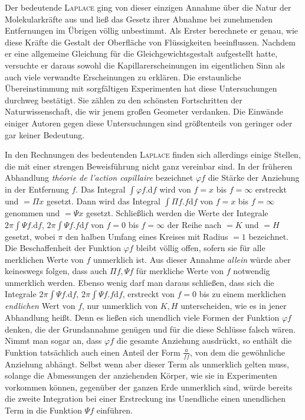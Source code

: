 Der bedeutende \textsc{Laplace} ging von dieser einzigen Annahme über die Natur der Molekularkräfte aus und ließ das Gesetz ihrer Abnahme bei zunehmenden Entfernungen im Übrigen völlig unbestimmt. Als Erster berechnete er genau, wie diese Kräfte die Gestalt der Oberfläche von Flüssigkeiten beeinflussen. Nachdem er eine allgemeine Gleichung für die Gleichgewichtsgestalt aufgestellt hatte, versuchte er daraus sowohl die Kapillarerscheinungen im eigentlichen Sinn als auch viele verwandte Erscheinungen zu erklären. Die erstaunliche Übereinstimmung mit sorgfältigen Experimenten hat diese Untersuchungen durchweg bestätigt. Sie zählen zu den schönsten Fortschritten der Naturwissenschaft, die wir jenem großen Geometer verdanken. Die Einwände einiger Autoren gegen diese Untersuchungen sind größtenteils von geringer oder gar keiner Bedeutung.

In den Rechnungen des bedeutenden \textsc{Laplace} finden sich allerdings einige Stellen, die mit einer strengen Beweisführung nicht ganz vereinbar sind. In der früheren Abhandlung \textit{théorie de l’action capillaire} bezeichnet $\varphi f$ die Stärke der Anziehung in der Entfernung $f$. Das Integral $\int\varphi f.\mathrm{d}f$ wird von $f=x$ bis $f=\infty$ erstreckt und $=\Pi x$ gesetzt. Dann wird das Integral $\int\Pi f.f\mathrm{d}f$ von $f=x$ bis $f=\infty$ genommen und $=\Psi x$ gesetzt. Schließlich werden die Werte der Integrale $2\pi\int\Psi f.\mathrm{d}f$, $2\pi\int\Psi f.f\mathrm{d}f$ von $f=0$ bis $f=\infty$ der Reihe nach $=K$ und $=H$ gesetzt, wobei $\pi$ den halben Umfang eines Kreises mit Radius $=1$ bezeichnet. Die Beschaffenheit der Funktion $\varphi f$ bleibt völlig offen, sofern sie für alle merklichen Werte von $f$ unmerklich ist. Aus dieser Annahme \textit{allein} würde aber keineswegs folgen, dass auch $\Pi f,\Psi f$ für merkliche Werte von $f$ notwendig unmerklich werden. Ebenso wenig darf man daraus schließen, dass sich die Integrale $2\pi\int\Psi f.\mathrm{d}f$, $2\pi\int\Psi f.f\mathrm{d}f$, erstreckt von $f=0$ bis zu einem merklichen \textit{endlichen} Wert von $f$, nur unmerklich von $K,H$ unterscheiden, wie es in jener Abhandlung heißt. Denn es ließen sich unendlich viele Formen der Funktion $\varphi f$ denken, die der Grundannahme genügen und für die diese Schlüsse falsch wären. Nimmt man sogar an, dass $\varphi f$ die gesamte Anziehung ausdrückt, so enthält die Funktion tatsächlich auch einen Anteil der Form $\frac{a}{ff}$, von dem die gewöhnliche Anziehung abhängt. Selbst wenn aber dieser Term als unmerklich gelten muss, solange die Abmessungen der anziehenden Körper, wie sie in Experimenten vorkommen können, gegenüber der ganzen Erde unmerklich sind, würde bereits die zweite Integration bei einer Erstreckung ins Unendliche einen unendlichen Term in die Funktion $\Psi f$ einführen.

